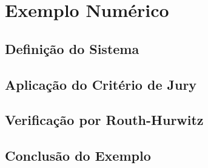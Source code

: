 \chapter{Exemplo Numérico}
\label{cap:exemplo}

\section{Definição do Sistema}


\section{Aplicação do Critério de Jury}


\section{Verificação por Routh-Hurwitz}


\section{Conclusão do Exemplo}


